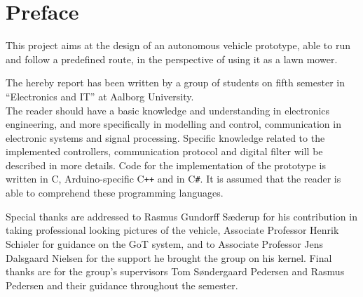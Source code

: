 \chapter*{Preface}
\vspace{-12 pt}
This project aims at the design of an autonomous vehicle prototype, able to run and follow a predefined route, in the perspective of using it as a lawn mower.

The hereby report has been written by a group of students on fifth semester in ``Electronics and IT'' at Aalborg University.\\
The reader should have a basic knowledge and understanding in electronics engineering, and more specifically in modelling and control, communication in electronic systems and signal processing. Specific knowledge related to the implemented controllers, communication protocol and digital filter will be described in more details. Code for the implementation of the prototype is written in C, Arduino-specific C\texttt{++} and in C\texttt{\#}. It is assumed that the reader is able to comprehend these programming languages.

Special thanks are addressed to Rasmus Gundorff Sæderup for his contribution in taking professional looking pictures of the vehicle, Associate Professor Henrik Schiøler for guidance on the GoT system, and to Associate Professor Jens Dalsgaard Nielsen for the support he brought the group on his kernel. Final thanks are for the group's supervisors Tom Søndergaard Pedersen and Rasmus Pedersen and their guidance throughout the semester.

